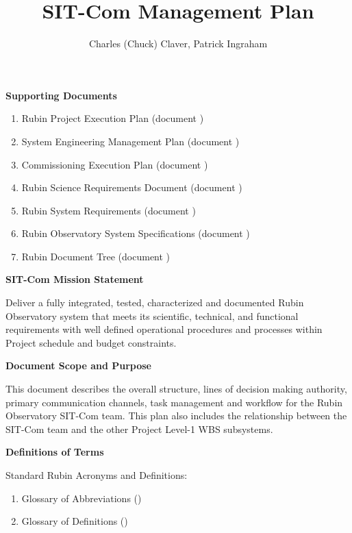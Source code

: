 \documentclass[SE,lsstdraft,authoryear,toc]{lsstdoc, lsstdraft}
\title{SIT-Com Management Plan}
\author{%
Charles (Chuck) Claver, Patrick Ingraham
}
\date{\vcsDate}
\begin{document}
\maketitle


\textbf{Supporting Documents}

    \begin{enumerate}
        \item Rubin Project Execution Plan (document )

        \item System Engineering Management Plan (document )

        \item Commissioning Execution Plan (document )

        \item Rubin Science Requirements Document (document )

        \item Rubin System Requirements (document )

        \item Rubin Observatory System Specifications (document )

        \item Rubin Document Tree (document )

    \end{enumerate}

\textbf{SIT-Com Mission Statement}
\label{sec:Mission}

Deliver a fully integrated, tested, characterized and documented Rubin Observatory system that meets its scientific, technical, and functional requirements with well defined operational procedures and processes within Project schedule and budget constraints.

\textbf{Document Scope and Purpose}
\label{sec:Scope}

This document describes the overall structure, lines of decision making authority, primary communication channels, task management and workflow for the Rubin Observatory SIT-Com team.
This plan also includes the relationship between the SIT-Com team and the other Project Level-1 WBS subsystems.

\textbf{Definitions of Terms}

Standard Rubin Acronyms and Definitions:
\begin{enumerate}
    \item Glossary of Abbreviations ()
    \item Glossary of Definitions ()
\end{enumerate}
\end{document}
